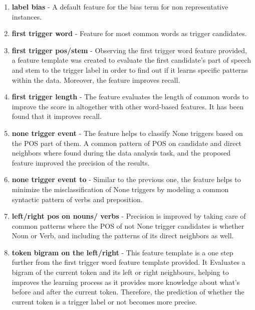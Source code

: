 \documentclass{article} %
\begin{document}
\begin{enumerate}

\item \textbf{label bias} - A default feature for the bias term for non representative instances.

\item \textbf{first trigger word} - Feature for most common words as trigger candidates.

\item \textbf{first trigger pos/stem} - Observing the first trigger word feature provided, a feature template was created to evaluate the first candidate’s part of speech and stem to the trigger label in order to find out if it learns specific patterns within the data. Moreover, the feature improves recall.

\item \textbf{first trigger length} - The feature evaluates the length of common words to improve the score in altogether with other word-based features. It has been found that it improves recall.

\item \textbf{none trigger event} - The feature helps to classify None triggers based on the POS part of them. A common pattern of POS on candidate and direct neighbors where found during the data analysis task, and the proposed feature improved the precision of the results.

\item \textbf{none trigger event to} - Similar to the previous one, the feature helps to minimize the misclassification of None triggers by modeling a common syntactic pattern of verbs and preposition.

\item \textbf{left/right pos on nouns/ verbs} - Precision is improved by taking care of common patterns where the POS of not None trigger candidates is whether Noun or Verb, and including the patterns of its direct neighbors as well.

\item \textbf{token bigram on the left/right} - This feature template is a one step further from the first trigger word feature template provided. It Evaluates a bigram of the current token and its left or right neighbours, helping to improves the learning process as it provides more knowledge about what’s before and after the current token. Therefore, the prediction of whether the current token is a trigger label or not becomes more precise.


\end{enumerate}
\end{document}
